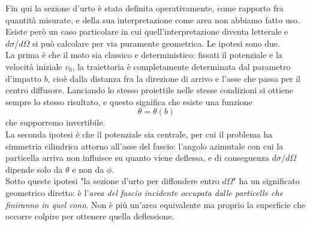 Fin qui la sezione d'urto è stata definita operativamente, come rapporto fra quantità misurate, e della sua interpretazione come area non abbiamo fatto uso. Esiste però un caso particolare in cui quell'interpretazione diventa letterale e $d\sigma/d\Omega$ si può calcolare per via puramente geometrica. Le ipotesi sono due.\\

La prima è che il moto sia classico e deterministico: fissati il potenziale e la velocità iniziale $v_0$, la traiettoria è completamente determinata dal parametro d'impatto $b$, cioè dalla distanza fra la direzione di arrivo e l'asse che passa per il centro diffusore. Lanciando lo stesso proiettile nelle stesse condizioni si ottiene sempre lo stesso risultato, e questo significa che esiste una funzione
%
\begin{equation}
    \theta = \theta(b)
    \label{eq:mappa_b_theta}
\end{equation}
che supporremo invertibile. \\
La seconda ipotesi è che il potenziale sia centrale, per cui il problema ha simmetria cilindrica attorno all'asse del fascio: l'angolo azimutale con cui la particella arriva non influisce su quanto viene deflessa, e di conseguenza $d\sigma/d\Omega$ dipende solo da $\theta$ e non da $\phi$.\\

Sotto queste ipotesi "la sezione d'urto per diffondere entro $d\Omega$" ha un significato geometrico diretto: è l'\emph{area del fascio incidente occupata dalle particelle che finiranno in quel cono}. Non è più un'area equivalente ma proprio la superficie che occorre colpire per ottenere quella deflessione.

